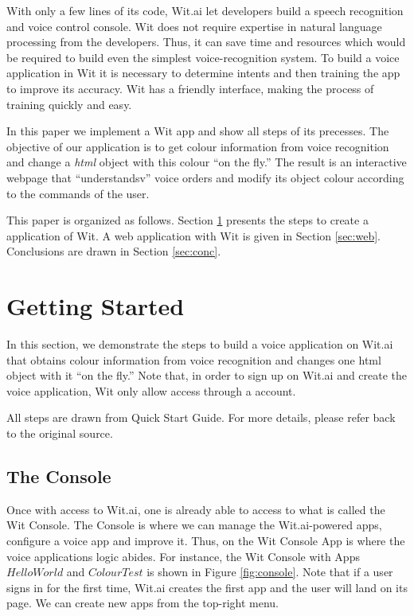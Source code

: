 \documentclass[twoside,11pt]{article}
\begin{document}
With only a few lines of its code, Wit.ai let developers build a speech recognition and voice control console.
Wit does not require expertise in natural language processing from the developers.
Thus, it can save time and resources which would be required to build even the simplest voice-recognition system.
To build a voice application in Wit it is necessary to determine intents and then training the app to improve its accuracy.
Wit has a friendly interface, making the process of training quickly and easy.

In this paper we implement a Wit app and show all steps of its precesses.
The objective of our application is to get colour information from voice recognition and change a \emph{html} object with this colour ``on the fly.''
The result is an interactive webpage that ``understandsv'' voice orders and modify its object colour according to the commands of the user.


This paper is organized as follows.
Section \ref{sec:get} presents the steps to create a application of Wit.
A web application with Wit is given in Section \ref{sec:web}.
Conclusions are drawn in Section \ref{sec:conc}.

\section{Getting Started}
\label{sec:get}


In this section, we demonstrate the steps to build a voice application on Wit.ai that obtains colour information from voice recognition and changes one html object with it ``on the fly.''
Note that, in order to sign up on Wit.ai and create the voice application, Wit only allow access through a \cite{github_2016} account.

All steps are drawn from \cite{1_wit.ai_2016} Quick Start Guide.
For more details, please refer back to the original source.

\subsection{The Console}

Once with access to Wit.ai, one is already able to access to what is called the Wit Console. 
The Console is where we can manage the Wit.ai-powered apps, configure a voice app and improve it.
Thus, on the Wit Console App is where the voice applications logic abides.
For instance, the Wit Console with Apps $HelloWorld$ and $ColourTest$ is shown in Figure \ref{fig:console}.
Note that if a user signs in for the first time, Wit.ai creates the first app and the user will land on its page.
We can create new apps from the top-right menu.
\end{document}
